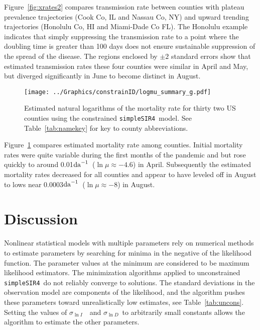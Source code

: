 \documentclass[12pt,letterpaper]{article}
\newcommand\perda{$\rm{da}^{-1}$}
\newcommand\SSm{{\tt simpleSIR4}}
\newcommand\slI{$\sigma_{\ln I}$\ }
\newcommand\slD{$\sigma_{\ln D}$}
\begin{document}
{Figure~\ref{fig:xrates2} compares transmission rate between counties
with plateau prevalence trajectories (Cook Co, IL and Nassau Co, NY) and
upward  trending trajectories (Honolulu Co, HI and Miami-Dade Co
FL). The Honolulu example indicates that simply suppressing the
transmission rate to a point where the doubling time is greater than
100 days does not ensure sustainable suppression of the spread of the
disease. The regions enclosed
by $\pm 2$ standard errors show that estimated transmission rates
these four counties were similar in April and May, but diverged
significantly in June to become distinct in August.

\begin{figure}[!h]
\begin{center}
\texttt{[image: ../Graphics/constrainID/logmu\_summary\_g.pdf]}\\
\end{center}
\caption{\label{fig:drates}
Estimated natural logarithms of the mortality rate for thirty two US
counties using the constrained \SSm\ model.
See Table~\ref{tab:namekey} for key to county abbreviations.
}
\end{figure}

Figure~\ref{fig:drates} compares estimated mortality rate among
counties. Initial mortality rates were quite variable during the first
months of the pandemic and but rose quickly to around 
0.01\perda\ ($\ln \mu \approx -4.6$) in April. Subsequently the
estimated mortality rates decreased for all counties and appear to
have leveled off in August to lows near
0.0003\perda\ ($\ln \mu \approx -8$) in August.

\section*{Discussion}

Nonlinear statistical models with multiple parameters rely
on numerical methods to estimate parameters by searching for minima
in the negative of the likelihood
function. The parameter values at the minimum are considered to be
maximum likelihood estimators.  The minimization algorithms applied to
unconstrained \SSm\ do not reliably converge to solutions. The
standard deviations in the observation model are components of the
likelihood, and the algorithm pushes these parameters toward
unrealistically low estimates, see Table~\ref{tab:uncons}.
Setting the values of
\slI\ and \slD\ to arbitrarily small constants allows the
algorithm to estimate the other parameters.

}
\end{document}
